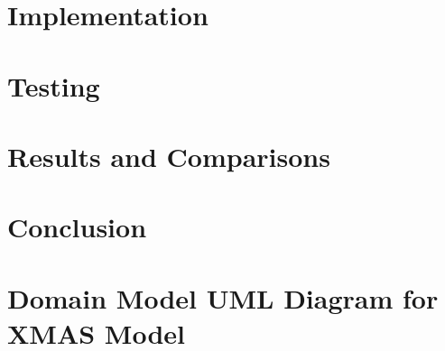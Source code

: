 \documentclass[10pt,twoside]{book}                  %
\begin{document}

















\chapter{Implementation}














\chapter{Testing}




\chapter{Results and Comparisons}




\chapter{Conclusion}



\appendix

\chapter{Domain Model UML Diagram for XMAS Model \label{sec:Domain-Model-UML}}
\end{document}
